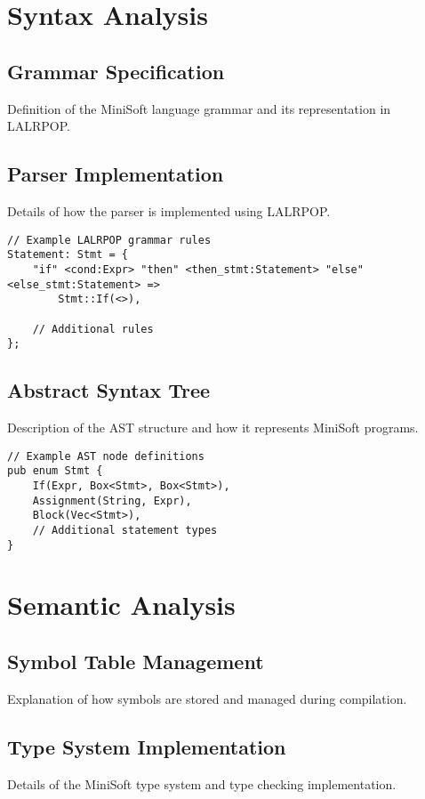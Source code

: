 \documentclass[12pt,a4paper]{article}
\begin{document}
\section{Syntax Analysis}
\subsection{Grammar Specification}
Definition of the MiniSoft language grammar and its representation in LALRPOP.

\subsection{Parser Implementation}
Details of how the parser is implemented using LALRPOP.

\begin{lstlisting}[caption={LALRPOP Grammar Rules}]
// Example LALRPOP grammar rules
Statement: Stmt = {
    "if" <cond:Expr> "then" <then_stmt:Statement> "else" <else_stmt:Statement> => 
        Stmt::If(<>),
    
    // Additional rules
};
\end{lstlisting}

\subsection{Abstract Syntax Tree}
Description of the AST structure and how it represents MiniSoft programs.

\begin{lstlisting}[caption={AST Node Definitions}]
// Example AST node definitions
pub enum Stmt {
    If(Expr, Box<Stmt>, Box<Stmt>),
    Assignment(String, Expr),
    Block(Vec<Stmt>),
    // Additional statement types
}
\end{lstlisting}

\section{Semantic Analysis}
\subsection{Symbol Table Management}
Explanation of how symbols are stored and managed during compilation.

\subsection{Type System Implementation}
Details of the MiniSoft type system and type checking implementation.
\end{document}
